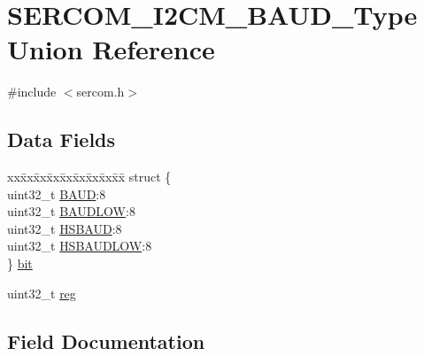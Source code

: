 \hypertarget{union_s_e_r_c_o_m___i2_c_m___b_a_u_d___type}{}\section{S\+E\+R\+C\+O\+M\+\_\+\+I2\+C\+M\+\_\+\+B\+A\+U\+D\+\_\+\+Type Union Reference}
\label{union_s_e_r_c_o_m___i2_c_m___b_a_u_d___type}


{\ttfamily \#include $<$sercom.\+h$>$}

\subsection*{Data Fields}
\begin{DoxyCompactItemize}
\item 
\begin{tabbing}
xx\=xx\=xx\=xx\=xx\=xx\=xx\=xx\=xx\=\kill
struct \{\\
\>uint32\_t \mbox{\hyperlink{union_s_e_r_c_o_m___i2_c_m___b_a_u_d___type_aad456b1da6c809e2a3c6297ff4e194ee}{BAUD}}:8\\
\>uint32\_t \mbox{\hyperlink{union_s_e_r_c_o_m___i2_c_m___b_a_u_d___type_aac9bc26ad4f51c8c8dfd76fd5429296c}{BAUDLOW}}:8\\
\>uint32\_t \mbox{\hyperlink{union_s_e_r_c_o_m___i2_c_m___b_a_u_d___type_a70f9ad5dc7725dd48cb52205e24e7ea2}{HSBAUD}}:8\\
\>uint32\_t \mbox{\hyperlink{union_s_e_r_c_o_m___i2_c_m___b_a_u_d___type_a65df97ff77d1a7350ceb846e268d1137}{HSBAUDLOW}}:8\\
\} \mbox{\hyperlink{union_s_e_r_c_o_m___i2_c_m___b_a_u_d___type_a859e71c9269dbd04ea35aee1d1b4f7de}{bit}}\\

\end{tabbing}\item 
uint32\+\_\+t \mbox{\hyperlink{union_s_e_r_c_o_m___i2_c_m___b_a_u_d___type_a6b91636401516a477989a336376d7b40}{reg}}
\end{DoxyCompactItemize}


\subsection{Field Documentation}
\mbox{\label{union_s_e_r_c_o_m___i2_c_m___b_a_u_d___type_aad456b1da6c809e2a3c6297ff4e194ee}} 
